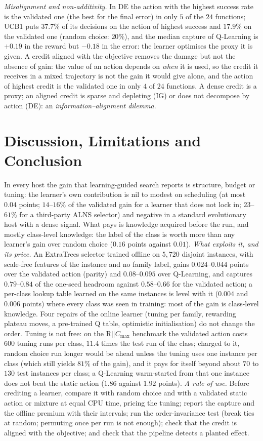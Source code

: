 \documentclass[conference,a4paper]{IEEEtran}
\newcommand{\Cmax}{C_{\max}}
\begin{document}
\emph{Misalignment and non-additivity.} In DE the action with the highest success rate is the validated one (the best for the final error) in only $5$ of the $24$ functions; UCB1 puts $37.7\%$ of its decisions on the action of highest success and $17.9\%$ on the validated one (random choice: $20\%$), and the median capture of Q-Learning is $+0.19$ in the reward but $-0.18$ in the error: the learner optimises the proxy it is given.
A credit aligned with the objective removes the damage but not the absence of gain: the value of an action depends on \emph{when} it is used, so the credit it receives in a mixed trajectory is not the gain it would give alone, and the action of highest credit is the validated one in only $4$ of $24$ functions.
A dense credit is a proxy; an aligned credit is sparse and depleting (IG) or does not decompose by action (DE): an \emph{information--alignment dilemma}.

\section{Discussion, Limitations and Conclusion}
\label{sec:limits}
In every host the gain that learning-guided search reports is structure, budget or tuning: the learner's own contribution is nil to modest on scheduling (at most $0.04$ points; $14$--$16\%$ of the validated gain for a learner that does not lock in; $23$--$61\%$ for a third-party ALNS selector) and negative in a standard evolutionary host with a dense signal.
What pays is knowledge acquired before the run, and mostly class-level knowledge: the label of the class is worth more than any learner's gain over random choice ($0.16$ points against $0.01$).
\emph{What exploits it, and its price.} An ExtraTrees selector trained offline on $5{,}720$ disjoint instances, with scale-free features of the instance and no family label, gains $0.024$--$0.044$ points over the validated action (parity) and $0.08$--$0.095$ over Q-Learning, and captures $0.79$--$0.84$ of the one-seed headroom against $0.58$--$0.66$ for the validated action; a per-class lookup table learned on the same instances is level with it ($0.004$ and $0.006$ points) where every class was seen in training: most of the gain is class-level knowledge.
Four repairs of the online learner (tuning per family, rewarding plateau moves, a pre-trained Q table, optimistic initialisation) do not change the order.
Tuning is not free: on the R$||\Cmax$ benchmark the validated action costs $600$ tuning runs per class, $11.4$ times the test run of the class; charged to it, random choice run longer would be ahead unless the tuning uses one instance per class (which still yields $81\%$ of the gain), and it pays for itself beyond about $70$ to $130$ test instances per class; a Q-Learning warm-started from that one instance does not beat the static action ($1.86$ against $1.92$ points).
\emph{A rule of use.} Before crediting a learner, compare it with random choice and with a validated static action or mixture at equal CPU time, pricing the tuning; report the capture and the offline premium with their intervals; run the order-invariance test (break ties at random; permuting once per run is not enough); check that the credit is aligned with the objective; and check that the pipeline detects a planted effect.
\end{document}
